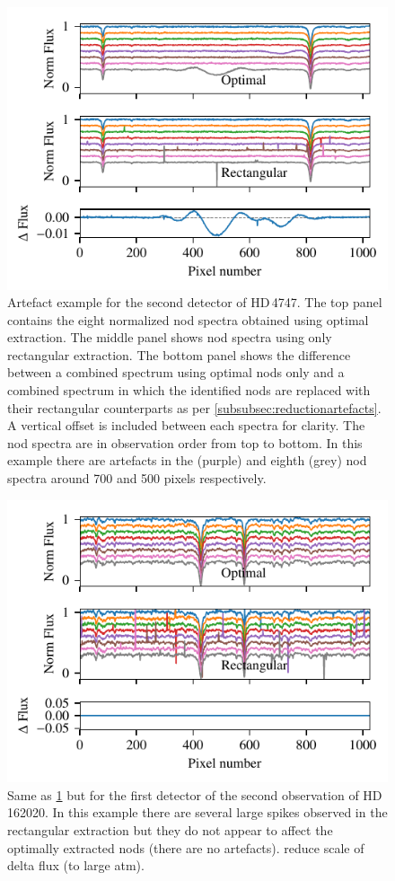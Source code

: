 \begin{figure}
    \centering
    \includegraphics[width=0.7\linewidth]{figures/appendix/bp_plots/extraction_comparision_HD4747-1_chip_2}
    \caption{Artefact example for the second detector of {HD\,4747}.
    The top panel contains the eight normalized nod spectra obtained using optimal extraction.
    The middle panel shows nod spectra using only rectangular extraction.
    The bottom panel shows the difference between a combined spectrum using optimal nods only and a combined spectrum in which the identified nods are replaced with their rectangular counterparts as per \cref{subsubsec:reductionartefacts}.
    A vertical offset is included between each spectra for clarity.
    The nod spectra are in observation order from top to bottom.
    In this example there are artefacts in the  (purple) and eighth (grey) nod spectra around 700 and 500 pixels respectively.}
    \label{fig:artefact_example1}
\end{figure}
\begin{figure}
    \centering
    \includegraphics[width=0.7\linewidth]{figures/appendix/bp_plots/extraction_comparision_HD162020-2_chip_1}
    \caption{Same as \cref{fig:artefact_example1} but for the first detector of the second observation of {HD\,162020}.
    In this example there are several large spikes observed in the rectangular extraction but they do not appear to affect the optimally extracted nods (there are no artefacts). {\red{} reduce scale of delta flux (to large atm)}.}
    \label{fig:artefact_example2}
\end{figure}
